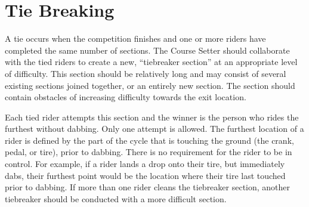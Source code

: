 \section{Tie Breaking}
A tie occurs when the competition finishes and one or more riders have completed the same number of sections.
The Course Setter should collaborate with the tied riders to create a new, ``tiebreaker section'' at an appropriate level of difficulty. 
This section should be relatively long and may consist of several existing sections joined together, or an entirely new section.
The section should contain obstacles of increasing difficulty towards the exit location.

Each tied rider attempts this section and the winner is the person who rides the furthest without dabbing.
Only one attempt is allowed. 
The furthest location of a rider is defined by the part of the cycle that is touching the ground (the crank, pedal, or tire), prior to dabbing. 
There is no requirement for the rider to be in control. 
For example, if a rider lands a drop onto their tire, but immediately dabs, their furthest point would be the location where their tire last touched prior to dabbing.
If more than one rider cleans the tiebreaker section, another tiebreaker should be conducted with a more difficult section.
